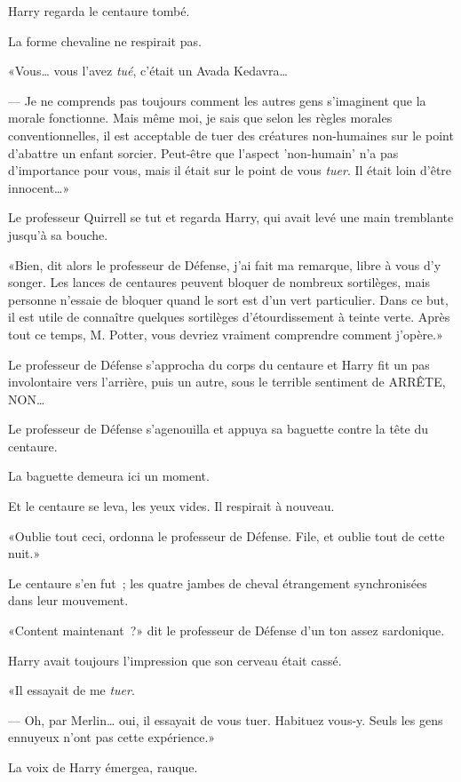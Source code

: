 Harry regarda le centaure tombé.

La forme chevaline ne respirait pas.

«Vous… vous l'avez \emph{tué}, c'était un Avada Kedavra…

--- Je ne comprends pas toujours comment les autres gens s'imaginent que la morale fonctionne. Mais même moi, je sais que selon les règles morales conventionnelles, il est acceptable de tuer des créatures non-humaines sur le point d'abattre un enfant sorcier. Peut-être que l'aspect 'non-humain' n'a pas d'importance pour vous, mais il était sur le point de vous \emph{tuer}. Il était loin d'être innocent…»

Le professeur Quirrell se tut et regarda Harry, qui avait levé une main tremblante jusqu'à sa bouche.

«Bien, dit alors le professeur de Défense, j'ai fait ma remarque, libre à vous d'y songer. Les lances de centaures peuvent bloquer de nombreux sortilèges, mais personne n'essaie de bloquer quand le sort est d'un vert particulier. Dans ce but, il est utile de connaître quelques sortilèges d'étourdissement à teinte verte. Après tout ce temps, M. Potter, vous devriez vraiment comprendre comment j'opère.»

Le professeur de Défense s'approcha du corps du centaure et Harry fit un pas involontaire vers l'arrière, puis un autre, sous le terrible sentiment de ARRÊTE, NON…

Le professeur de Défense s'agenouilla et appuya sa baguette contre la tête du centaure.

La baguette demeura ici un moment.

Et le centaure se leva, les yeux vides. Il respirait à nouveau.

«Oublie tout ceci, ordonna le professeur de Défense. File, et oublie tout de cette nuit.»

Le centaure s'en fut~; les quatre jambes de cheval étrangement synchronisées dans leur mouvement.

«Content maintenant~?» dit le professeur de Défense d'un ton assez sardonique.

Harry avait toujours l'impression que son cerveau était cassé.

«Il essayait de me \emph{tuer}.

--- Oh, par Merlin… oui, il essayait de vous tuer. Habituez vous-y. Seuls les gens ennuyeux n'ont pas cette expérience.»

La voix de Harry émergea, rauque.

